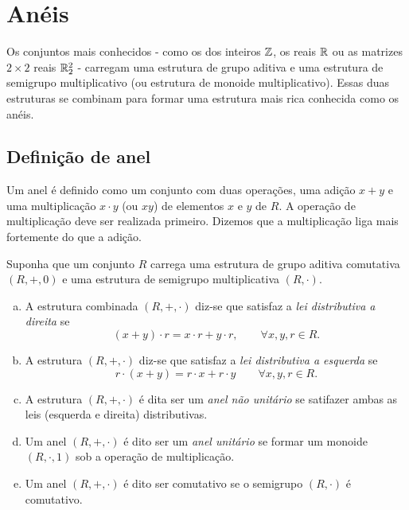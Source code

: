 \section{Anéis}
  Os conjuntos mais conhecidos - como os dos inteiros $\mathbb{Z}$, os reais $\mathbb{R}$ ou as matrizes $2 \times 2$ reais $\mathbb{R}^{2}_{2}$ - carregam uma estrutura de grupo aditiva e uma estrutura de semigrupo multiplicativo (ou estrutura de monoide multiplicativo). Essas duas estruturas se combinam para formar uma estrutura mais rica conhecida como os anéis.
\subsection{Definição de anel}
  Um anel é definido como um conjunto com duas operações, uma adição $x+y$ e uma multiplicação $x\cdot y$ (ou $xy$) de elementos $x$ e $y$ de $R$. A operação de multiplicação deve ser realizada primeiro. Dizemos que a multiplicação liga mais fortemente do que a adição.
\begin{definition}
  Suponha que um conjunto $R$ carrega uma estrutura de grupo aditiva comutativa $(R,+,0)$ e uma estrutura de semigrupo multiplicativa $(R,\cdot)$.
  \begin{enumerate}[(a)]
    \item A estrutura combinada $(R,+,\cdot)$ diz-se que satisfaz a \emph{lei distributiva a direita} se 
      \begin{equation}\label{DISTDIRRING}
        (x + y) \cdot r = x\cdot r + y \cdot r,\quad \quad \forall x,y,r \in R.
      \end{equation}
    \item A estrutura $(R,+,\cdot)$ diz-se que satisfaz a \emph{lei distributiva a esquerda} se 
      \begin{equation}\label{DISTESQRING}
        r\cdot (x + y) = r\cdot x + r \cdot y\quad \quad \forall x,y,r \in R.
      \end{equation}
    \item A estrutura $(R,+,\cdot)$ é dita ser um \emph{anel não unitário} se satifazer ambas as leis (esquerda e direita) distributivas.
    \item Um anel $(R,+,\cdot)$ é dito ser um \emph{anel unitário} se formar um monoide $(R,\cdot , 1)$ sob a operação de multiplicação.
    \item Um anel $(R,+,\cdot)$ é dito ser comutativo se o semigrupo $(R,\cdot)$ é comutativo.
    \end{enumerate}
\end{definition}
